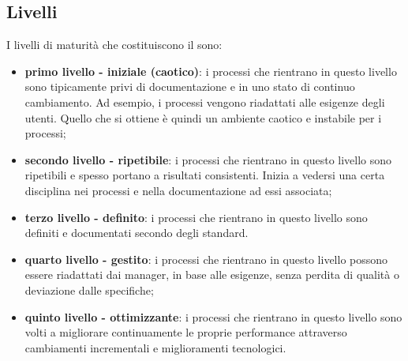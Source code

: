 \documentclass[PianoDiQualifica.tex]{subfiles}
\begin{document}
	\subsection{Livelli}
	I livelli di maturità che costituiscono il  sono:
	\begin{itemize}
		\item \textbf{primo livello - iniziale (caotico)}: i processi che rientrano in questo livello sono tipicamente privi di documentazione e in uno stato di
		continuo cambiamento. Ad esempio, i processi vengono riadattati alle esigenze degli utenti. Quello che si ottiene è quindi un
		ambiente caotico e instabile per i processi;
		\item \textbf{secondo livello - ripetibile}:  i processi che rientrano in questo livello sono ripetibili e spesso portano a risultati consistenti.
		Inizia a vedersi una certa disciplina nei processi e nella documentazione ad essi associata;
		\item \textbf{terzo livello - definito}: i processi che rientrano in questo livello sono definiti e documentati secondo degli standard.
		\item \textbf{quarto livello - gestito}: i processi che rientrano in questo livello possono essere riadattati dai manager, in base alle esigenze, senza
		perdita di qualità o deviazione dalle specifiche;
		\item \textbf{quinto livello - ottimizzante}: i processi che rientrano in questo livello sono volti a migliorare continuamente le proprie
		performance attraverso cambiamenti incrementali e miglioramenti tecnologici.
	\end{itemize}
\end{document}
